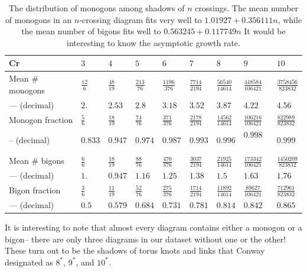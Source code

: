 \documentclass[amsmath,secnumarabic,floatfix,amssymb,nofootinbib,nobibnotes,letterpaper,11pt,tightenlines,showkeys]{revtex4}
\theoremstyle{definition}
\let\mgp=\marginpar \marginparwidth18mm \marginparsep1mm
\def\marginpar#1{\mgp{\raggedright\tiny #1}}
\let\lbl=\label
\def\label#1{\lbl{#1}\ifinner\else\marginpar{\ref{#1} #1}\ignorespaces\fi}
\begin{document}
\begin{table}
\begin{ruledtabular}
\renewcommand{\arraystretch}{1.2}
\begin{tabular}{lllllllll}
Cr                 & $3$ & $4$             & $5$            & $6$                        & $7$ & $8$ & $9$ & $10$ \\ \hline
Mean $\#$ monogons & $\frac{\num{12}}{\num{6}}$ & $\frac{\num{48}}{\num{19}}$ & $\frac{\num{213}}{\num{76}}$ & $\frac{\num{1196}}{\num{376}}$ & $\frac{\num{7714}}{\num{2194}}$ & $\frac{\num{56540}}{\num{14614}}$ & $\frac{\num{448584}}{\num{106421}}$ & $\frac{\num{3758456}}{\num{823832}}$\\
\hphantom{Mean} --- (decimal) & $2.$ & $2.53$ & $2.8$ & $3.18$ & $3.52$ & $3.87$ & $4.22$ & $4.56$ \\
Monogon fraction   & $\frac{\num{5}}{\num{6}}$ & $\frac{\num{18}}{\num{19}}$ & 
$\frac{\num{74}}{\num{76}}$ & $\frac{\num{371}}{\num{376}}$ & 
$\frac{\num{2178}}{\num{2194}}$ & 
$\frac{\num{14562}}{\num{14614}}$ & 
$\frac{\num{106216}}{\num{106421}}$ & 
$\frac{\num{822989}}{\num{823832}}$ \\ 
\hphantom{Mean} -- (decimal) & $0.833$ & $0.947$ & $0.974$ & $0.987$ & $0.993$ & $0.996$ & $0.998$ \
& $0.999$ \\ \hline
Mean $\#$ bigons & $\frac{\num{6}}{\num{6}}$ & $\frac{\num{18}}{\num{19}}$ & 
$\frac{\num{88}}{\num{76}}$ & $\frac{\num{470}}{\num{376}}$ & 
$\frac{\num{3037}}{\num{2194}}$ & $\frac{\num{21925}}{\num{14614}}$ & 
$\frac{\num{173342}}{\num{106421}}$ & $\frac{\num{1450209}}{\num{823832}}$ \\
\hphantom{Mean} --- (decimal) & $1.$ & $0.947$ & $1.16$ & $1.25$ & $1.38$ & $1.5$ & $1.63$ & $1.76$ \\
Bigon fraction & $\frac{\num{3}}{\num{6}}$ & $\frac{\num{11}}{\num{19}}$ & 
$\frac{\num{52}}{\num{76}}$ & $\frac{\num{275}}{\num{376}}$ & 
$\frac{\num{1714}}{\num{2194}}$ & $\frac{\num{11892}}{\num{14614}}$ & 
$\frac{\num{89627}}{\num{106421}}$ & $\frac{\num{712961}}{\num{823832}}$ \\
\hphantom{Mean} --- (decimal) & $0.5$ & $0.579$ & $0.684$ & $0.731$ & $0.781$ & $0.814$ & $0.842$ & $0.865$ \\
\end{tabular}
\end{ruledtabular}
\caption{The distribution of monogons among shadows of $n$ crossings. The mean number of monogons in an $n$-crossing diagram fits very well to $1.01927 + 0.356111 n$, while the mean number of bigons fits well to $0.563245 + 0.117749 n$ It would be interesting to know the asymptotic growth rate.}
\label{tab:monogons and bigons}
\end{table}
It is interesting to note that almost every diagram contains either a monogon or a bigon-- there are only three diagrams in our dataset without one or the other! These turn out to be the shadows of torus knots and links that Conway designated as $8^*$, $9^*$, and $10^*$.
\end{document}
